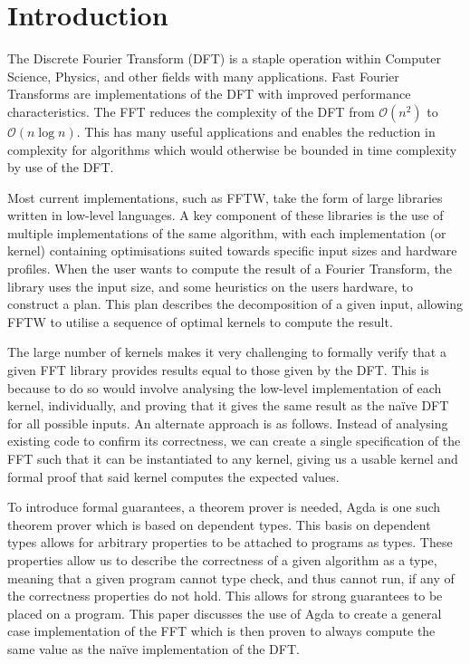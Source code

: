 \section{Introduction}

The Discrete Fourier Transform (DFT) is a staple operation within Computer 
Science, Physics, and other fields with many applications.
Fast Fourier Transforms are implementations of the DFT with improved 
performance characteristics.
The FFT reduces the complexity of the DFT from 
$\mathcal{O}\left(n^2\right)$ to $\mathcal{O}\left(n\log n\right)$.
This has many useful applications and enables the reduction 
in complexity for algorithms which would otherwise be bounded in time complexity
by use of the DFT.

Most current implementations, such as FFTW\cite{Frigo2005}, take the form of 
large libraries written in low-level languages. 
A key component of these libraries is the use of multiple implementations of 
the same algorithm, with each implementation (or kernel) containing 
optimisations suited towards specific input sizes and hardware profiles. 
When the user wants to compute the result of a Fourier Transform, the library 
uses the input size, and some heuristics on the users hardware, to construct a 
plan.
This plan describes the decomposition of a given input, allowing FFTW to 
utilise a sequence of optimal kernels to compute the result.

The large number of kernels makes it very challenging to formally verify that a
given FFT library provides results equal to those given by the DFT. 
This is because to do so would involve analysing the low-level implementation 
of each kernel, individually, and proving that it gives the same result as the 
naïve DFT for all possible inputs.
An alternate approach is as follows. %
Instead of analysing existing code to confirm its correctness, we can create a 
single specification of the FFT such that it can be instantiated to any kernel, 
giving us a usable kernel and formal proof that said kernel computes the 
expected values.

To introduce formal guarantees, a theorem prover is needed, Agda is
one such theorem prover which is based on dependent types.
This basis on dependent types allows for arbitrary properties to be attached
to programs as types.
These properties allow us to describe the correctness of a given 
algorithm as a type, meaning that a given program cannot type check, and thus
cannot run, if any of the correctness properties do not hold.
This allows for strong guarantees to be placed on a program.
This paper discusses the use of Agda to create a general case implementation 
of the FFT which is then proven to always compute the same value as the naïve 
implementation of the DFT.

